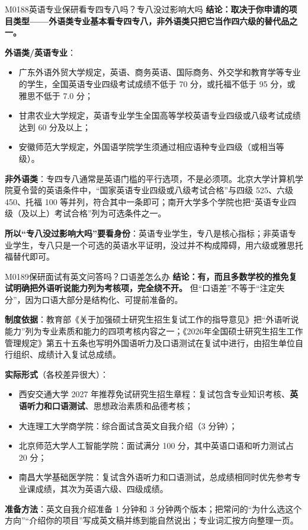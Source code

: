 \begin{qa}{M0188}{英语专业保研看专四专八吗？专八没过影响大吗}
\textbf{结论：取决于你申请的项目类型——外语类专业基本看专四专八，非外语类只把它当作四六级的替代品之一。}

\textbf{外语类/英语专业}：
\begin{itemize}
  \item 广东外语外贸大学规定，英语、商务英语、国际商务、外交学和教育学等专业的学生，全国英语专业四级考试成绩不低于 70 分，或托福不低于 95 分，或雅思不低于 7.0 分；
  \item 甘肃农业大学规定，英语专业学生全国高等学校英语专业四级或八级考试成绩达到 60 分及以上；
  \item 安徽师范大学规定，外国语学院学生须通过相应语种专业四级（或相当等级）。
\end{itemize}

\textbf{非外语类}：专四专八通常是英语门槛的平行选项，不是必须项。北京大学计算机学院夏令营的英语条件中，“国家英语专业四级或八级考试合格”与四级 525、六级 450、托福 100 等并列，符合其中一条即可；南开大学多个学院也把“英语专业四级（及以上）考试合格”列为可选条件之一。

\textbf{所以“专八没过影响大吗”要看身份}：英语专业学生，专八是核心指标；非英语专业学生，专八只是一个可选的英语水平证明，没过并不构成障碍，用六级或雅思托福替代即可。
\end{qa}

\begin{qa}{M0189}{保研面试有英文问答吗？口语差怎么办}
\textbf{结论：有，而且多数学校的推免复试明确把外语听说能力列为考核项，完全绕不开。} 但“口语差”不等于“注定失分”，因为口语大部分是结构化、可提前准备的。

\textbf{制度依据}：教育部《关于加强硕士研究生招生复试工作的指导意见》把“外语听说能力”列为专业素质和能力的四项考核内容之一；《2026年全国硕士研究生招生工作管理规定》第五十五条也写明外国语听力及口语测试在复试中进行，由招生单位自行组织、成绩计入复试总成绩。

\textbf{实际形式}（各校差异很大）：
\begin{itemize}
  \item 西安交通大学 2027 年推荐免试研究生招生章程：复试包含专业知识考核、\textbf{英语听力和口语测试}、思想政治素质和品德考核；
  \item 大连理工大学商学院：综合面试含英文自我介绍（3 分钟）；
  \item 北京师范大学人工智能学院：面试满分 100 分，其中英语口语和听力测试占 20 分；
  \item 南昌大学基础医学院：复试含外语听力和口语测试，总成绩相同时优先参考专业课成绩，其次为英语六级、四级成绩。
\end{itemize}

\textbf{准备方法}：英文自我介绍准备 1 分钟和 3 分钟两个版本；把常问的“为什么选这个方向”“介绍你的项目”写成英文稿并练到能自然说出；专业词汇按方向整理一页。
\end{qa}

